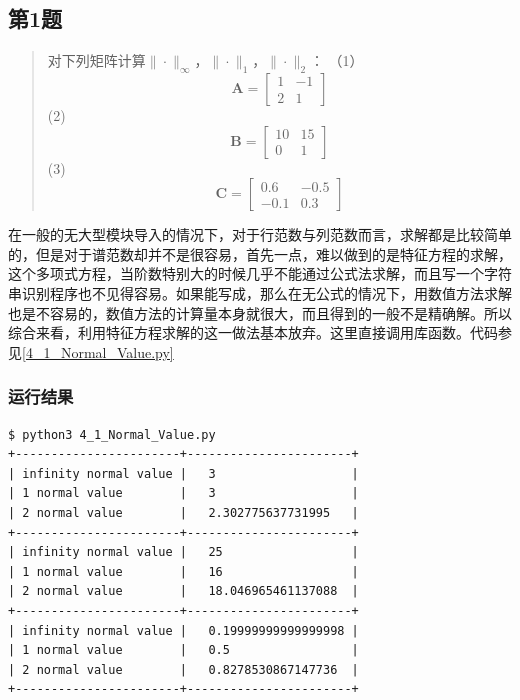\subsection{第1题}
\begin{quote}
    {\kaishu
        对下列矩阵计算$\|\cdot\|_{\infty}$，$\|\cdot\|_{1}$，$\|\cdot\|_{2}$：
        （1）\begin{equation}
                \mathbf{A}=\left[ \begin{array}{rr}{1} & {-1} \\ {2} & {1}\end{array}\right]
            \end{equation}
        (2) \begin{equation}
                \mathbf{B}=\left[ \begin{array}{rr}{10} & {15} \\ {0} & {1}\end{array}\right]
            \end{equation}
        (3) \begin{equation}
                \mathbf{C}=\left[ \begin{array}{rr}{0.6} & {-0.5} \\ {-0.1} & {0.3}\end{array}\right]
            \end{equation}
    }
\end{quote}

在一般的无大型模块导入的情况下，对于行范数与列范数而言，求解都是比较简单的，但是对于谱范数却并不是很容易，首先一点，难以做到的是特征方程的求解，这个多项式方程，当阶数特别大的时候几乎不能通过公式法求解，而且写一个字符串识别程序也不见得容易。如果能写成，那么在无公式的情况下，用数值方法求解也是不容易的，数值方法的计算量本身就很大，而且得到的一般不是精确解。所以综合来看，利用特征方程求解的这一做法基本放弃。这里直接调用库函数。代码参见\ref{4_1_Normal_Value.py}

\subsubsection{运行结果}

\begin{lstlisting}[style = bash]
$ python3 4_1_Normal_Value.py 
+-----------------------+-----------------------+
| infinity normal value |   3                   |
| 1 normal value        |   3                   |
| 2 normal value        |   2.302775637731995   |
+-----------------------+-----------------------+
| infinity normal value |   25                  |
| 1 normal value        |   16                  |
| 2 normal value        |   18.046965461137088  |
+-----------------------+-----------------------+
| infinity normal value |   0.19999999999999998 |
| 1 normal value        |   0.5                 |
| 2 normal value        |   0.8278530867147736  |
+-----------------------+-----------------------+
\end{lstlisting}

